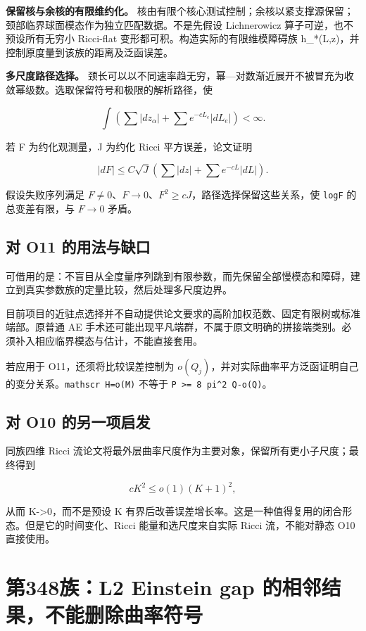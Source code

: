 \documentclass[UTF8,11pt,fontset=none]{ctexart}
\begin{document}
\textbf{保留核与余核的有限维约化。} 核由有限个核心测试控制；余核以紧支撑源保留；颈部临界球面模态作为独立匹配数据。不是先假设 Lichnerowicz 算子可逆，也不预设所有无穷小 Ricci-flat 变形都可积。构造实际的有限维模障碍族 h\_*(L,z)，并控制原度量到该族的距离及泛函误差。

\textbf{多尺度路径选择。} 颈长可以以不同速率趋无穷，幂---对数渐近展开不被冒充为收敛幂级数。选取保留符号和极限的解析路径，使

\[
\int\left(\sum|dz_\alpha|+\sum e^{-cL_e}|dL_e|\right)<\infty.
\]

若 F 为约化观测量，J 为约化 Ricci 平方误差，论文证明

\[
|dF|\le C\sqrt J\left(\sum|dz|+\sum e^{-cL}|dL|\right).
\]

假设失败序列满足 \(F\ne0\)、\(F\to0\)、\(F^2\ge cJ\)，路径选择保留这些关系，使 \texttt{log\textbar{}F\textbar{}} 的总变差有限，与 \(F\to0\) 矛盾。

\subsection{对 O11 的用法与缺口}\label{ch6:ux5bf9-o11-ux7684ux7528ux6cd5ux4e0eux7f3aux53e3}

可借用的是：不盲目从全度量序列跳到有限参数，而先保留全部慢模态和障碍，建立到真实参数族的定量比较，然后处理多尺度边界。

目前项目的近驻点选择并不自动提供论文要求的高阶加权范数、固定有限树或标准端部。原普通 AE 手术还可能出现平凡端群，不属于原文明确的拼接端类别。必须补入相应临界模态与估计，不能直接套用。

若应用于 O11，还须将比较误差控制为 \(o(Q_j)\)，并对实际曲率平方泛函证明自己的变分关系。\texttt{mathscr\ H=o(M)} 不等于 \texttt{P\ \textgreater{}=\ 8\ pi\^{}2\ Q-o(Q)}。

\subsection{对 O10 的另一项启发}\label{ch6:ux5bf9-o10-ux7684ux53e6ux4e00ux9879ux542fux53d1}

同族四维 Ricci 流论文将最外层曲率尺度作为主要对象，保留所有更小子尺度；最终得到

\[
cK^2\le o(1)(K+1)^2,
\]

从而 K-\textgreater0，而不是预设 K 有界后改善误差增长率。这是一种值得复用的闭合形态。但是它的时间变化、Ricci 能量和选尺度来自实际 Ricci 流，不能对静态 O10 直接使用。

\section{第348族：L2 Einstein gap 的相邻结果，不能删除曲率符号}\label{ch6:ux7b2c348ux65cfl2-einstein-gap-ux7684ux76f8ux90bbux7ed3ux679cux4e0dux80fdux5220ux9664ux66f2ux7387ux7b26ux53f7}
\end{document}
